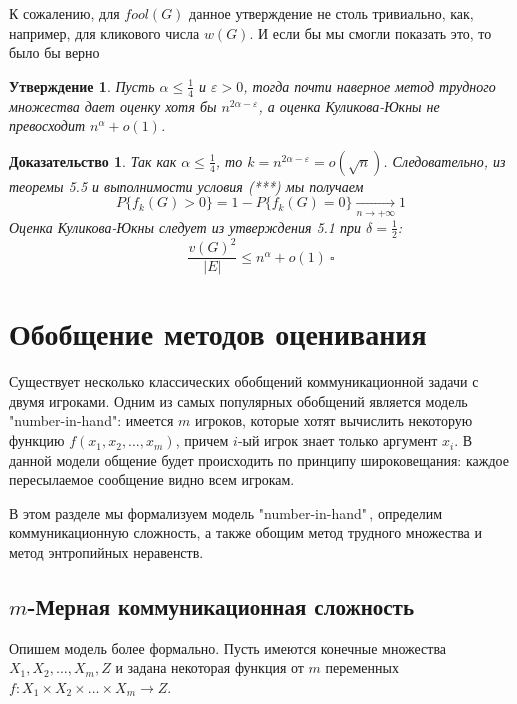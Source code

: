 \documentclass[a4paper]{article}
\newtheorem*{msolution}{Доказательство}
\newtheorem{mclaim}{Утверждение}[section]
\begin{document}
К сожалению, для $fool(G)$ данное утверждение не столь тривиально, как, например, для кликового числа $w(G)$. И если бы 
мы смогли показать это, то было бы верно
\begin{mclaim}
    Пусть $\alpha \leq \frac{1}{4}$ и $\varepsilon > 0$, тогда почти наверное 
    метод трудного множества дает оценку хотя бы $n^{2\alpha - \varepsilon}$, а оценка Куликова-Юкны 
    не превосходит $n^{\alpha} + o(1)$. 
\end{mclaim}
\begin{msolution}
    Так как $\alpha \leq \frac{1}{4}$, то $k = n^{2\alpha - \varepsilon} = o(\sqrt{n})$. Следовательно, из 
    теоремы 5.5 и выполнимости условия (***) мы получаем $$P\{f_k(G) > 0\} = 1 - P\{f_k(G) = 0\}\xrightarrow[n \to +\infty]{} 1$$
    Оценка Куликова-Юкны следует из утверждения 5.1 при $\delta = \frac{1}{2}$:
    $$\frac{v(G)^2}{|E|} \leq n^{\alpha} + o(1)\ \square$$ 
\end{msolution}



\setcounter{mclaim}{0}
\setcounter{mlemma}{0}	
\setcounter{mtheorem}{0}
\addtocounter{section}{1}
\section*{Обобщение методов оценивания}
Существует несколько классических обобщений коммуникационной задачи с двумя игроками. Одним из самых 
популярных обобщений является модель "number-in-hand": имеется $m$ игроков, которые хотят вычислить 
некоторую функцию $f(x_1,x_2,\ldots,x_m)$, причем $i$-ый игрок знает только аргумент $x_i$. В данной модели 
общение будет происходить по принципу широковещания: каждое пересылаемое сообщение видно всем игрокам.

В этом разделе мы формализуем модель "number-in-hand"\,, определим коммуникационную сложность, а также 
обощим метод трудного множества и метод энтропийных неравенств.

\setcounter{subsection}{0}
\subsection{$m$-Мерная коммуникационная сложность}

Опишем модель более формально. Пусть имеются конечные множества $X_1, X_2, \ldots, X_m, Z$ и задана
некоторая функция от $m$ переменных $f:X_1\times X_2\times \ldots\times X_m\rightarrow Z$.
\end{document}
